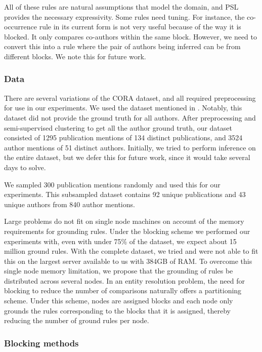 \documentclass{article}
\begin{document}
            All of these rules are natural assumptions that model the domain, and PSL provides the necessary expressivity. Some rules need tuning. For instance, the co-occurrence rule in its current form is not very useful because of the way it is blocked. It only compares co-authors within the same block. However, we need to convert this into a rule where the pair of authors being inferred can be from different blocks. We note this for future work.
        
        \subsubsection{Data}
        
            There are several variations of the CORA dataset, and all required preprocessing for use in our experiments. We used the dataset mentioned in \cite{singla2006entity}. Notably, this dataset did not provide the ground truth for all authors. After preprocessing and semi-supervised clustering to get all the author ground truth, our dataset consisted of 1295 publication mentions of 134 distinct publications, and 3524 author mentions of 51 distinct authors. Initially, we tried to perform inference on the entire dataset, but we defer this for future work, since it would take several days to solve.

            We sampled 300 publication mentions randomly and used this for our experiments. This subsampled dataset contains 92 unique publications and 43 unique authors from 840 author mentions.
            
            Large problems do not fit on single node machines on account of the memory requirements for grounding rules. Under the blocking scheme we performed our experiments with, even with under 75\% of the dataset, we expect about 15 million ground rules. With the complete dataset, we tried and were not able to fit this on the largest server available to us with 384GB of RAM. To overcome this single node memory limitation, we propose that the grounding of rules be distributed across several nodes. In an entity resolution problem, the need for blocking to reduce the number of comparisons naturally offers a partitioning scheme. Under this scheme, nodes are assigned blocks and each node only grounds the rules corresponding to the blocks that it is assigned, thereby reducing the number of ground rules per node.
            
        \subsubsection{Blocking methods}
\end{document}
